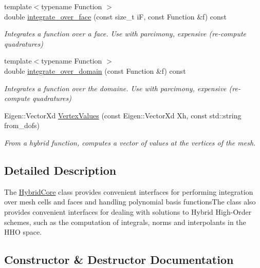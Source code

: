 \begin{DoxyCompactItemize}
{\footnotesize template$<$typename Function $>$ }\\double \hyperlink{group__HybridCore_gacb6ad78c453a5a5ec6bc91d7a14e4c2a}{integrate\+\_\+over\+\_\+face} (const size\+\_\+t iF, const Function \&f) const
\begin{DoxyCompactList}\small\item\em Integrates a function over a face. Use with parcimony, expensive (re-\/compute quadratures) \end{DoxyCompactList}\item 
{\footnotesize template$<$typename Function $>$ }\\double \hyperlink{group__HybridCore_gad6aeaa4f65c67b92307c273254f539ed}{integrate\+\_\+over\+\_\+domain} (const Function \&f) const
\begin{DoxyCompactList}\small\item\em Integrates a function over the domaine. Use with parcimony, expensive (re-\/compute quadratures) \end{DoxyCompactList}\item 
Eigen\+::\+Vector\+Xd \hyperlink{classHArDCore3D_1_1HybridCore_a4e623d59fe09c23c4b714541e4aff5ea}{Vertex\+Values} (const Eigen\+::\+Vector\+Xd Xh, const std\+::string from\+\_\+dofs)
\begin{DoxyCompactList}\small\item\em From a hybrid function, computes a vector of values at the vertices of the mesh. \end{DoxyCompactList}\end{DoxyCompactItemize}


\subsection{Detailed Description}
The \hyperlink{classHArDCore3D_1_1HybridCore}{Hybrid\+Core} class provides convenient interfaces for performing integration over mesh cells and faces and handling polynomial basis functions\+The class also provides convenient interfaces for dealing with solutions to Hybrid High-\/\+Order schemes, such as the computation of integrals, norms and interpolants in the H\+HO space. 

\subsection{Constructor \& Destructor Documentation}
\mbox{\label{classHArDCore3D_1_1HybridCore_af4978b5ad1f20f152357e94ffa94bfa9}} 
